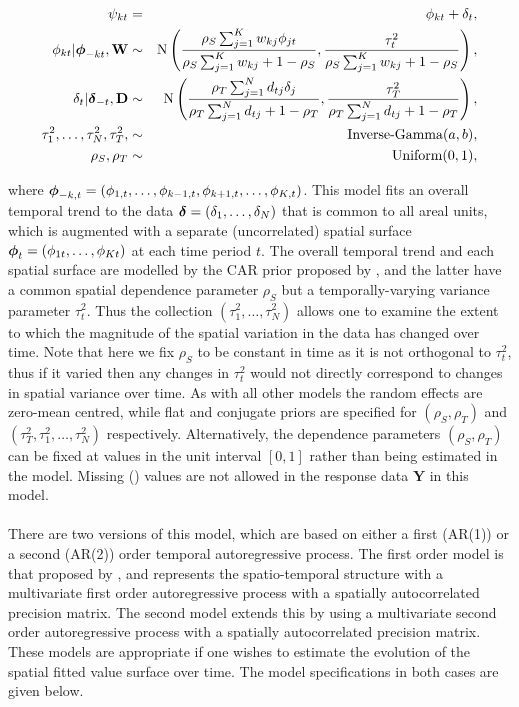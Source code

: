\documentclass[article, nojss]{jss}
\newcommand{\bd}[1]{\ensuremath{\mbox{\boldmath $#1$}}}
\begin{document}
\begin{eqnarray}
\psi_{kt}&=&\phi_{kt} +  \delta_t,\label{carsepspat}\\
\phi_{kt}|\bd{\phi}_{-kt},\mathbf{W}&\sim&\mbox{N}\left(\frac{\rho_{S}\sum_{j=1}^Kw_{kj}\phi_{jt}}{\rho_{S}\sum_{j=1}^Kw_{kj} + 1-\rho_{S}}, \frac{\tau^2_{t}}{\rho_{S}\sum_{j=1}^Kw_{kj} + 1-\rho_{S}}\right),\nonumber\\
\delta_t|\bd{\delta}_{-t},\mathbf{D}&\sim&\mbox{N}\left(\frac{\rho_{T}\sum_{j=1}^N d_{tj}\delta_j}{\rho_{T}\sum_{j=1}^N d_{tj} + 1-\rho_{T}}, \frac{\tau^2_{T}}{\rho_{T}\sum_{j=1}^N d_{tj}+1-\rho_{T}}\right),\nonumber\\
\tau^2_{1},\ldots, \tau^2_{N}, \tau^2_{T}, &\sim&\mbox{Inverse-Gamma}(a,b),\nonumber\\
\rho_{S}, \rho_{T}&\sim&\mbox{Uniform}(0,1),\nonumber
\end{eqnarray}

where $\bd{\phi}_{-k,t}=(\phi_{1,t},\ldots,\phi_{k-1,t}, \phi_{k+1,t},\ldots,\phi_{K,t})$. This model fits an overall temporal trend to the data $\bd{\delta}=(\delta_1,\ldots,\delta_{N})$ that is common to all areal units, which is augmented with a separate (uncorrelated) spatial surface $\bd{\phi}_t=(\phi_{1t},\ldots, \phi_{Kt})$ at each time period $t$. The overall temporal trend and each spatial surface are modelled by the CAR prior proposed by \cite{leroux2000}, and the latter have a common spatial dependence parameter $\rho_S$ but a temporally-varying variance parameter $\tau^2_{t}$. Thus the collection $(\tau^2_{1},\ldots, \tau^2_{N})$ allows one to examine the extent to which the magnitude of the spatial variation in the data has changed over time. Note that here we fix $\rho_S$ to be constant in time as it is not orthogonal to $\tau^{2}_t$, thus if it varied then any changes in $\tau^{2}_t$ would not directly correspond to changes in spatial variance over time. As with all other models the random effects are zero-mean centred, while flat and conjugate priors are specified for $(\rho_S, \rho_T)$ and $(\tau^2_{T}, \tau^2_{1},\ldots, \tau^2_{N})$ respectively. Alternatively, the  dependence parameters $(\rho_{S}, \rho_{T})$ can be fixed at values in the unit interval $[0,1]$ rather than being estimated in the model. Missing () values are not allowed in the response data $\mathbf{Y}$ in this model.\\




\\
There are two versions of this model, which are based on either a first (AR(1)) or a second (AR(2)) order temporal autoregressive process. The first order model is that proposed by \cite{rushworth2014}, and represents the spatio-temporal structure with a multivariate first order autoregressive process with a spatially autocorrelated precision matrix. The second model extends this by using a multivariate second order autoregressive process with a spatially autocorrelated precision matrix. These models are appropriate if one wishes to estimate the  evolution of the spatial fitted value surface over time. The model specifications in both cases are given below.\vspace{0.5cm}
\end{document}
